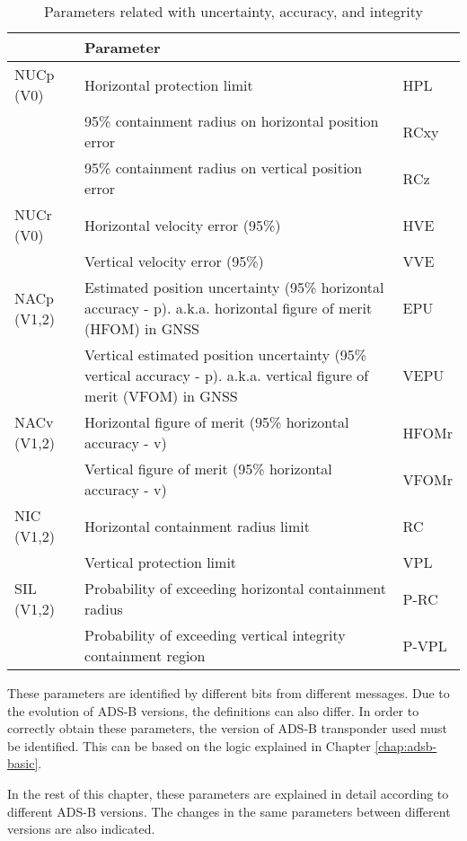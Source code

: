\begin{table}[ht]
\caption{Parameters related with uncertainty, accuracy, and integrity}
\label{tb:uncertainty-parameters}
\begin{tabular}{|l|p{8cm}|l|}
\hline
\textbf{} & \textbf{Parameter} &  \\ \hline
NUCp (V0) & Horizontal protection limit & HPL \\ \cline{2-3}
 & 95\% containment radius on horizontal position error & RCxy \\ \cline{2-3}
 & 95\% containment radius on vertical position error & RCz \\ \hline
NUCr (V0) & Horizontal velocity error (95\%) & HVE \\ \cline{2-3}
 & Vertical velocity error (95\%) & VVE \\ \hline
NACp (V1,2) & Estimated position uncertainty (95\% horizontal accuracy - p). a.k.a. horizontal figure of merit (HFOM) in GNSS & EPU \\ \cline{2-3}
 & Vertical estimated position uncertainty (95\% vertical accuracy - p). a.k.a. vertical figure of merit (VFOM) in GNSS & VEPU \\ \hline
NACv (V1,2) & Horizontal figure of merit (95\% horizontal accuracy - v) & HFOMr \\ \cline{2-3}
 & Vertical figure of merit (95\% horizontal accuracy - v) & VFOMr \\ \hline
NIC (V1,2) & Horizontal containment radius limit & RC \\ \cline{2-3}
 & Vertical protection limit & VPL \\ \hline
SIL (V1,2) & Probability of exceeding horizontal containment radius & P-RC \\ \cline{2-3}
 & Probability of exceeding vertical integrity containment region & P-VPL \\ \hline
\end{tabular}
\end{table}

These parameters are identified by different bits from different messages. Due to the evolution of ADS-B versions, the definitions can also differ. In order to correctly obtain these parameters, the version of ADS-B transponder used must be identified. This can be based on the logic explained in Chapter \ref{chap:adsb-basic}.

In the rest of this chapter, these parameters are explained in detail according to different ADS-B versions. The changes in the same parameters between different versions are also indicated.



